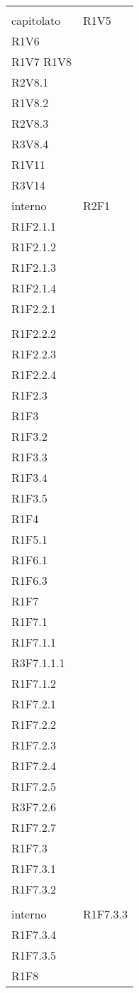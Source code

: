 \begin{longtable}{ >{\centering}p{}
		>{\centering}p{}}
	\tabularnewline
	\rowcolordark &	\tabularnewline
	 capitolato & R1V5 \\ R1V6 \\R1V7 R1V8 \\R2V8.1 \\R1V8.2 \\ R2V8.3 \\R3V8.4 \\R1V11 \\R3V14 \tabularnewline
	
	interno & R2F1\\
	R1F2.1.1 \\R1F2.1.2 \\R1F2.1.3 \\R1F2.1.4 \\R1F2.2.1 \\ \\R1F2.2.2 \\R1F2.2.3 \\R1F2.2.4 \\R1F2.3 \\R1F3 \\R1F3.2 \\R1F3.3 \\R1F3.4 \\R1F3.5 \\R1F4 \\R1F5.1 \\R1F6.1 \\R1F6.3 \\R1F7 \\R1F7.1 \\R1F7.1.1 \\R3F7.1.1.1 \\R1F7.1.2 \\R1F7.2.1 \\R1F7.2.2 \\R1F7.2.3 \\R1F7.2.4 

	\\R1F7.2.5 \\R3F7.2.6 \\R1F7.2.7 \\R1F7.3 \\R1F7.3.1 \\R1F7.3.2 
	\tabularnewline \rowcolorlight &	\tabularnewline
		
	interno & R1F7.3.3 \\R1F7.3.4 \\R1F7.3.5 \\R1F8 
	

\end{longtable}
